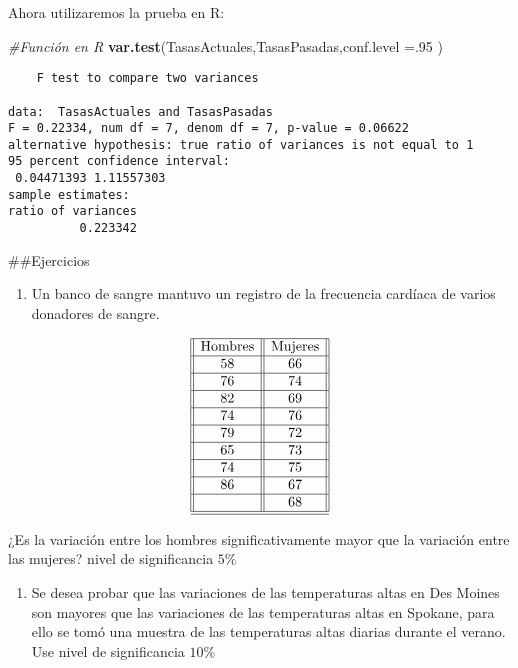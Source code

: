 \documentclass[
  a4paper,
  oneside,
  openany]{book}
\newenvironment{Shaded}{\begin{snugshade}}{\end{snugshade}}
\newcommand{\CommentTok}[1]{\textcolor[rgb]{0.56,0.35,0.01}{\textit{#1}}}
\newcommand{\DataTypeTok}[1]{\textcolor[rgb]{0.13,0.29,0.53}{#1}}
\newcommand{\DecValTok}[1]{\textcolor[rgb]{0.00,0.00,0.81}{#1}}
\newcommand{\KeywordTok}[1]{\textcolor[rgb]{0.13,0.29,0.53}{\textbf{#1}}}
\newcommand{\NormalTok}[1]{#1}
\providecommand{\tightlist}{%
  \setlength{\itemsep}{0pt}\setlength{\parskip}{0pt}}
\begin{document}
Ahora utilizaremos la prueba en R:

\begin{Shaded}
\begin{Highlighting}[]
\CommentTok{\#Función en R}
\KeywordTok{var.test}\NormalTok{(TasasActuales,TasasPasadas,}\DataTypeTok{conf.level =}\NormalTok{.}\DecValTok{95}\NormalTok{ )}
\end{Highlighting}
\end{Shaded}

\begin{verbatim}
    F test to compare two variances

data:  TasasActuales and TasasPasadas
F = 0.22334, num df = 7, denom df = 7, p-value = 0.06622
alternative hypothesis: true ratio of variances is not equal to 1
95 percent confidence interval:
 0.04471393 1.11557303
sample estimates:
ratio of variances 
          0.223342 
\end{verbatim}

\#\#Ejercicios

\begin{enumerate}
\def\labelenumi{\arabic{enumi}.}
\tightlist
\item
  Un banco de sangre mantuvo un registro de la frecuencia cardíaca de varios donadores de sangre.
\end{enumerate}

\[
\begin{array}{||c| |c||} 
\hline 
\mbox{Hombres}& \mbox{Mujeres} \\  
 \hline
58&66\\
 \hline
76&74\\
 \hline
82&69\\
 \hline
74&76\\
 \hline
79&72\\
 \hline
65&73\\
 \hline
74&75\\
 \hline
86&67\\
 \hline
&68\\
 \hline
\hline
\end{array}
\]

¿Es la variación entre los hombres significativamente mayor que la variación entre las mujeres? nivel de significancia \(5\%\)

\begin{enumerate}
\def\labelenumi{\arabic{enumi}.}
\setcounter{enumi}{1}
\tightlist
\item
  Se desea probar que las variaciones de las temperaturas altas en Des Moines son mayores que las variaciones de las temperaturas altas en Spokane, para ello se tomó una muestra de las temperaturas altas diarias durante el verano. Use nivel de significancia \(10\%\)
\end{enumerate}
\end{document}
